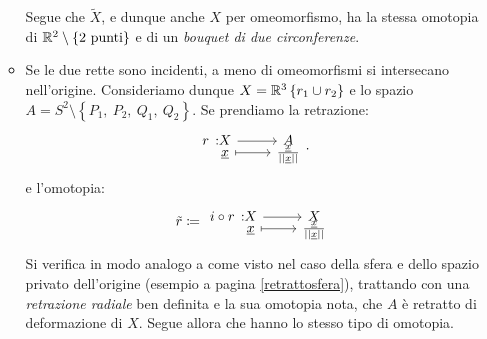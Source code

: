 \begin{examples}
\begin{enumerate}
\begin{itemize}
		Segue che $\tilde{X}$, e dunque anche $X$ per omeomorfismo, ha la stessa omotopia di $\mathbb{R}^2\setminus\left\{2\text{ punti}\right\}$ e di un \textit{bouquet di due circonferenze}.
		\item Se le due rette sono incidenti, a meno di omeomorfismi si intersecano nell'origine. Consideriamo dunque $X=\mathbb{R}^3\left\{r_1\cup r_2\right\}$ e lo spazio $A=S^2\setminus\left\{P_1,\ P_2,\ Q_1,\ Q_2\right\}$. Se prendiamo la retrazione:
		\begin{equation*}
			\funztot{r}{X}{A}{\underline{x}}{\frac{\underline{x}}{\labs \underline{x}\rabs}}.\\
		\end{equation*}
		e l'omotopia:
		\begin{equation*}
			\tilde{r}\coloneqq\funztot{ i\circ r}{X}{X}{\underline{x}}{\frac{\underline{x}}{\labs \underline{x}\rabs}}
		\end{equation*}
	Si verifica in modo analogo a come visto nel caso della sfera e dello spazio privato dell'origine (esempio a pagina \ref{retrattosfera}), trattando con una \textit{retrazione radiale} ben definita e la sua omotopia nota, che $A$ è retratto di deformazione di $X$. Segue allora che hanno lo stesso tipo di omotopia.
		\end{itemize}
	\end{enumerate}
\end{examples}